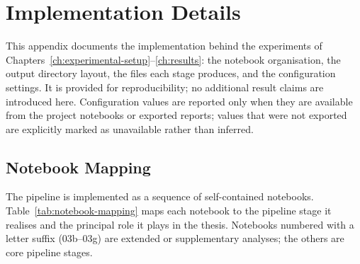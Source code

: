 %
%

\chapter{Implementation Details}
\label{app:implementation}

This appendix documents the implementation behind the experiments of
Chapters~\ref{ch:experimental-setup}--\ref{ch:results}: the notebook
organisation, the output directory layout, the files each stage produces, and
the configuration settings. It is provided for reproducibility; no additional
result claims are introduced here. Configuration values are reported only when
they are available from the project notebooks or exported reports; values that
were not exported are explicitly marked as unavailable rather than inferred.

\section{Notebook Mapping}
\label{app:notebook-mapping}

The pipeline is implemented as a sequence of self-contained notebooks.
Table~\ref{tab:notebook-mapping} maps each notebook to the pipeline stage it
realises and the principal role it plays in the thesis. Notebooks numbered with
a letter suffix (03b--03g) are extended or supplementary analyses; the others
are core pipeline stages.


